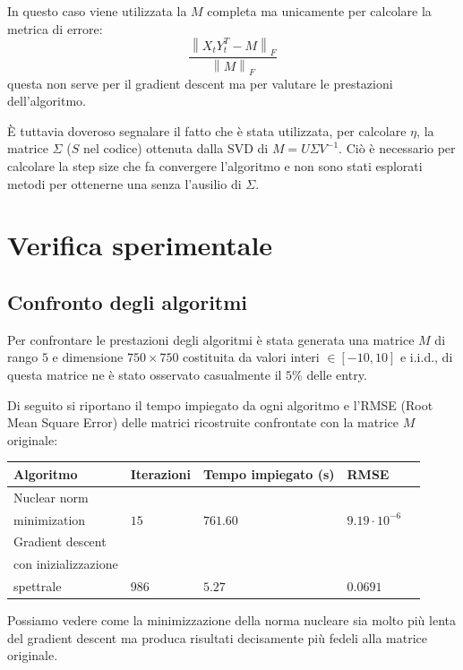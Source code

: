 \documentclass[12pt,a4paper]{report}
\newcommand{\frobnorm}[1]{\left\lVert#1\right\rVert _F}
\begin{document}
\newpage

In questo caso viene utilizzata la $M$ completa ma unicamente per
calcolare la metrica di errore:
$$\frac{\frobnorm{X_t Y_t^T - M}}{\frobnorm{M}}$$
questa non serve per il gradient descent
ma per valutare le prestazioni dell'algoritmo.

\`E tuttavia doveroso segnalare il fatto che è stata utilizzata,
per calcolare $\eta$, la matrice $\Sigma$
($S$ nel codice) ottenuta dalla SVD di $M = U\Sigma V^{-1}$.
Ciò è necessario per calcolare la step size che fa convergere l'algoritmo e
non sono stati esplorati metodi per ottenerne una senza l'ausilio di $\Sigma$.

\chapter{Verifica sperimentale}

\section{Confronto degli algoritmi}

Per confrontare le prestazioni degli algoritmi è stata generata una matrice
$M$ di rango $5$ e dimensione $750 \times 750$ costituita da valori
interi $\in [-10,10]$ e i.i.d., di questa matrice ne è stato
osservato casualmente il $5\%$ delle entry.

Di seguito si riportano il tempo impiegato
da ogni algoritmo e l'RMSE (Root Mean Square Error)
delle matrici ricostruite confrontate con la matrice $M$ originale:

\begin{table}[H]
  \centering
  \begin{tabular}{@{}lllll@{}}
  \toprule
  \textbf{Algoritmo} & \textbf{Iterazioni} & \textbf{Tempo impiegato (s)} & \textbf{RMSE} \\ \midrule
  Nuclear norm\\ minimization                         & $15$  & $761.60$ & $9.19\cdot 10^{-6}$ \\ \midrule
  Gradient descent\\ con inizializzazione\\ spettrale & $986$ & $5.27$   & $0.0691$             \\ \bottomrule
  \end{tabular}
\end{table}
Possiamo vedere come la minimizzazione della norma nucleare
sia molto più lenta del gradient descent ma produca risultati decisamente più
fedeli alla matrice originale.
\end{document}
